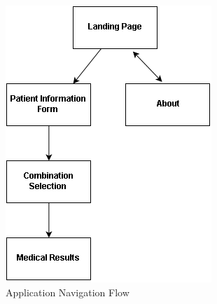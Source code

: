 \documentclass[12pt]{article}
\begin{document}
\begin{figure}
  \centering
  \includegraphics{navflow.png}
  \caption{Application Navigation Flow}
  \label{fig:Application Navigation Flow}
\end{figure}
\end{document}
